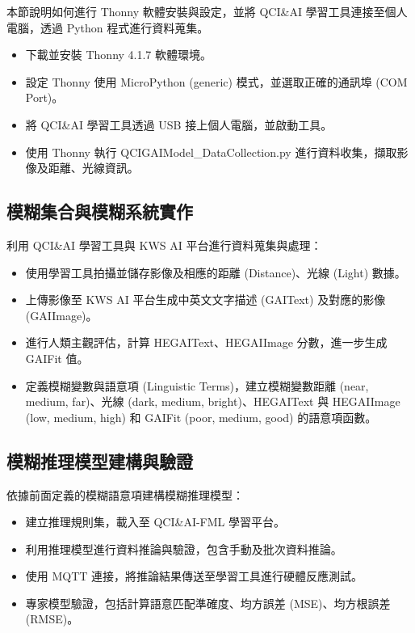 \documentclass[twocolumn,11pt,a4paper]{article}
\begin{document}
本節說明如何進行 Thonny 軟體安裝與設定，並將 QCI\&AI 學習工具連接至個人電腦，透過 Python 程式進行資料蒐集。

\begin{itemize}
    \item 下載並安裝 Thonny 4.1.7 軟體環境。
    \item 設定 Thonny 使用 MicroPython (generic) 模式，並選取正確的通訊埠 (COM Port)。
    \item 將 QCI\&AI 學習工具透過 USB 接上個人電腦，並啟動工具。
    \item 使用 Thonny 執行 QCIGAIModel\_DataCollection.py 進行資料收集，擷取影像及距離、光線資訊。
\end{itemize}

\subsection{模糊集合與模糊系統實作}

利用 QCI\&AI 學習工具與 KWS AI 平台進行資料蒐集與處理：

\begin{itemize}
    \item 使用學習工具拍攝並儲存影像及相應的距離 (Distance)、光線 (Light) 數據。
    \item 上傳影像至 KWS AI 平台生成中英文文字描述 (GAIText) 及對應的影像 (GAIImage)。
    \item 進行人類主觀評估，計算 HEGAIText、HEGAIImage 分數，進一步生成 GAIFit 值。
    \item 定義模糊變數與語意項 (Linguistic Terms)，建立模糊變數距離 (near, medium, far)、光線 (dark, medium, bright)、HEGAIText 與 HEGAIImage (low, medium, high) 和 GAIFit (poor, medium, good) 的語意項函數。
\end{itemize}

\subsection{模糊推理模型建構與驗證}

依據前面定義的模糊語意項建構模糊推理模型：

\begin{itemize}
    \item 建立推理規則集，載入至 QCI\&AI-FML 學習平台。
    \item 利用推理模型進行資料推論與驗證，包含手動及批次資料推論。
    \item 使用 MQTT 連接，將推論結果傳送至學習工具進行硬體反應測試。
    \item 專家模型驗證，包括計算語意匹配準確度、均方誤差 (MSE)、均方根誤差 (RMSE)。
\end{itemize}
\end{document}
